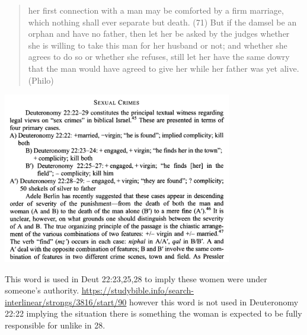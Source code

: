 \documentclass[11pt]{article}
\begin{document}
\begin{quote}
her first connection with a man may be comforted by a firm marriage, which nothing shall ever separate but death. (71) But if the damsel be an orphan and have no father, then let her be asked by the judges whether she is willing to take this man for her husband or not; and whether she agrees to do so or whether she refuses, still let her have the same dowry that the man would have agreed to give her while her father was yet alive.
(Philo)
\end{quote}

\includegraphics[width=10cm]{deuteronomy22_case_options}

This word is used in Deut 22:23,25,28 to imply these women were under someone’s authority. \url{https://studybible.info/search-interlinear/strongs/3816/start/90} however this word is not used in Deuteronomy 22:22 implying the situation there is something the woman is expected to be fully responsible for unlike in 28.
\end{document}
